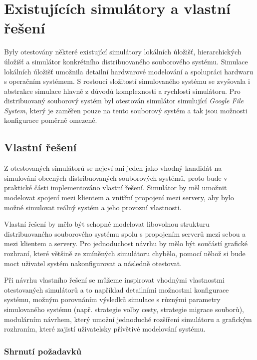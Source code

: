\documentclass[czech,DP]{thesiskiv}
\begin{document}
\section{Existujících simulátory a vlastní řešení}

Byly otestovány některé existující simulátory lokálních úložišť, hierarchických úložišť a simulátor konkrétního distribuovaného souborového systému. Simulace lokálních úložišť umožnila detailní hardwarové modelování a spolupráci hardwaru s operačním systémem. S rostoucí složitostí simulovaného systému se zvyšovala i abstrakce simulace hlavně z důvodů komplexnosti a rychlosti simulátoru. Pro distribuovaný souborový systém byl otestován simulátor simulující \textit{Google File System}, který je zaměřen pouze na tento souborový systém a tak jsou možnosti konfigurace poměrně omezené. 

\subsection{Vlastní řešení} \label{vlastnireseni}

Z otestovaných simulátorů se nejeví ani jeden jako vhodný kandidát na simulování obecných distribuovaných souborových systémů, proto bude v praktické části implementováno vlastní řešení. Simulátor by měl umožnit modelovat spojení mezi klientem a vnitřní propojení mezi servery, aby bylo možné simulovat reálný systém a jeho provozní vlastnosti. 

Vlastní řešení by mělo být schopné modelovat libovolnou strukturu distribuovaného souborového systému spolu s propojením serverů mezi sebou a mezi klientem a servery. Pro jednoduchost návrhu by mělo být součástí grafické rozhraní, které většině ze zmíněných simulátoru chybělo, pomocí něhož si bude moct uživatel systém nakonfigurovat a následně otestovat. 

Při návrhu vlastního řešení se můžeme inspirovat vhodnými vlastnostmi otestovaných simulátorů a to například detailními možnostmi konfigurace systému, možným porovnáním výsledků simulace s různými parametry simulovaného systému (např. strategie volby cesty, strategie migrace souborů), modulárním návrhem, který umožní jednoduché rozšíření simulátoru a grafickým rozhraním, které zajistí uživatelsky přívětivé modelování systému.

\subsubsection*{Shrnutí požadavků}
\end{document}

